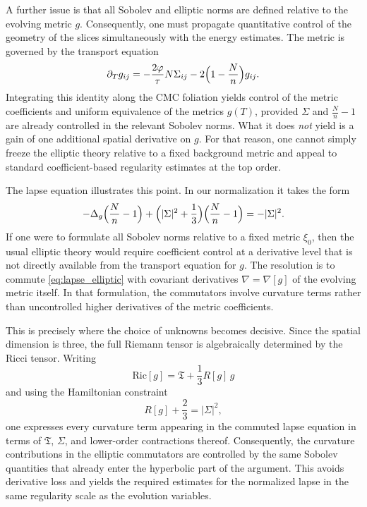 \documentclass{amsart}
\begin{document}
\medskip

\noindent A further issue is that all Sobolev and elliptic norms are defined relative to the evolving metric \(g\).  Consequently, one must propagate quantitative control of the geometry of the slices simultaneously with the energy estimates.  The metric is governed by the transport equation
\begin{equation}
\label{eq:metric_transport}
\partial_T g_{ij}
=
-\frac{2\varphi}{\tau}N\Sigma_{ij}
-
2\Bigl(1-\frac{N}{n}\Bigr)g_{ij}.
\end{equation}
Integrating this identity along the CMC foliation yields control of the metric coefficients and uniform equivalence of the metrics \(g(T)\), provided \(\Sigma\) and \(\frac{N}{n}-1\) are already controlled in the relevant Sobolev norms.  What it does \emph{not} yield is a gain of one additional spatial derivative on \(g\).  For that reason, one cannot simply freeze the elliptic theory relative to a fixed background metric and appeal to standard coefficient-based regularity estimates at the top order.

\noindent The lapse equation illustrates this point.  In our normalization it takes the form
\begin{equation}
\label{eq:lapse_elliptic}
-\Delta_{g}\Bigl(\frac{N}{n}-1\Bigr)
+
\Bigl(|\Sigma|^{2}+\frac13\Bigr)\Bigl(\frac{N}{n}-1\Bigr)
=
-|\Sigma|^{2}.
\end{equation}
If one were to formulate all Sobolev norms relative to a fixed metric \(\xi_{0}\), then the usual elliptic theory would require coefficient control at a derivative level that is not directly available from the transport equation for \(g\).  The resolution is to commute \eqref{eq:lapse_elliptic} with covariant derivatives \(\nabla=\nabla[g]\) of the evolving metric itself.  In that formulation, the commutators involve curvature terms rather than uncontrolled higher derivatives of the metric coefficients.

\noindent This is precisely where the choice of unknowns becomes decisive.  Since the spatial dimension is three, the full Riemann tensor is algebraically determined by the Ricci tensor.  Writing
\[
\text{Ric}[g]
=
\mathfrak T+\frac13 R[g]\,g
\]
and using the Hamiltonian constraint
\begin{equation}
\label{eq:ham_constraint}
R[g]+\frac{2}{3}=|\Sigma|^{2},
\end{equation}
one expresses every curvature term appearing in the commuted lapse equation in terms of \(\mathfrak T\), \(\Sigma\), and lower-order contractions thereof.  Consequently, the curvature contributions in the elliptic commutators are controlled by the same Sobolev quantities that already enter the hyperbolic part of the argument.  This avoids derivative loss and yields the required estimates for the normalized lapse in the same regularity scale as the evolution variables.
\end{document}
